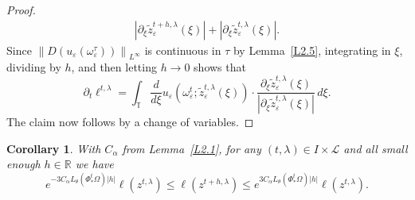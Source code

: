 \documentclass[reqno,centertags,12pt]{amsart}
\newtheorem{corollary}[theorem]{Corollary}
\theoremstyle{definition}
\numberwithin{equation}{section}
\newcommand{\abs}[1]{\left\lvert#1\right\rvert}
\newcommand{\norm}[1]{\left\|#1\right\|}
\newcommand{\bbR}{{\mathbb{R}}}
\newcommand{\bbT}{{\mathbb{T}}}
\newcommand{\eps}{\varepsilon}
\newcommand{\tht}{\theta}
\begin{document}
\begin{proof}
\begin{equation*}
\begin{aligned}
            {\abs{\partial_{\xi}\tilde{z}_{\eps}^{t+h,\lambda}(\xi)}
            + \abs{\partial_{\xi}\tilde{z}_{\eps}^{t,\lambda}(\xi)}}.
        \end{aligned}
    \end{equation*}
    Since $\norm{D(u_{\eps}(\omega_{\eps}^{\tau}))}_{L^{\infty}}$ is continuous in $\tau$
    by Lemma~\ref{L2.5}, integrating in $\xi$, dividing by $h$,
    and then letting $h\to 0$ shows that
    \[
        \partial_{t}\ell^{t,\lambda}
        = \int_{\bbT}
        \frac d{d\xi} u_{\eps}(\omega_{\eps}^{t};\tilde{z}_{\eps}^{t,\lambda}(\xi))
        \cdot \frac{\partial_{\xi}\tilde{z}_{\eps}^{t,\lambda}(\xi)}
        {\abs{\partial_{\xi}\tilde{z}_{\eps}^{t,\lambda}(\xi)}}\,d\xi.
    \]
    The claim now follows by a change of variables.
\end{proof}

\begin{corollary}\label{C3.2}
    With $C_{\alpha}$ from Lemma~\ref{L2.1}, for any $(t,\lambda)\in I\times\mathcal{L}$ and all small enough $h\in\bbR$ we have
    \[
        e^{-3C_{\alpha}L_{\tht}(\Phi_{*}^{t}\Omega)\abs{h}}\ell(z^{t,\lambda})
        \leq \ell(z^{t+h,\lambda}) \leq
        e^{3C_{\alpha}L_{\tht}(\Phi_{*}^{t}\Omega)\abs{h}}\ell(z^{t,\lambda}).
    \]
\end{corollary}
\end{document}
